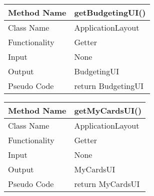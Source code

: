 \documentclass{article}
\begin{document}
\begin{center}
\begin{tabular}{|p{2.5cm}||p{10cm}|}
\hline
Method Name & getBudgetingUI() \\
\hline
Class Name & ApplicationLayout \\
\hline
Functionality & Getter\\
\hline

Input & None\\
\hline
Output & BudgetingUI\\
\hline

Pseudo Code & return BudgetingUI\\
\hline
\end{tabular}
\end{center}


\begin{center}
\begin{tabular}{|p{2.5cm}||p{10cm}|}
\hline
Method Name & getMyCardsUI() \\
\hline
Class Name & ApplicationLayout \\
\hline
Functionality & Getter\\
\hline

Input & None\\
\hline
Output & MyCardsUI\\
\hline

Pseudo Code & return MyCardsUI\\
\hline
\end{tabular}
\end{center}


\end{document}
